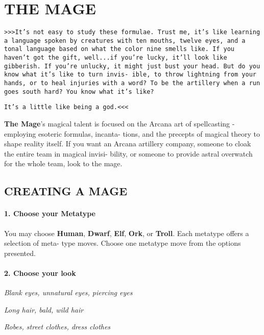 
\section{THE MAGE}
\begin{multicols}{3}
\setlength{\parskip}{.05cm}

\texttt{>>>It’s not easy to study these formulae. Trust me, it’s like
learning a language spoken by creatures with ten mouths,
twelve eyes, and a tonal language based on what the color
nine smells like. If you haven’t got the gift, well...if you’re
lucky, it’ll look like gibberish. If you’re unlucky, it might just
bust your head. But do you know what it’s like to turn invis-
ible, to throw lightning from your hands, or to heal injuries
with a word? To be the artillery when a run goes south hard?
You know what it’s like?}

\texttt{It’s a little like being a god.<<<}

\textbf{The Mage}’s magical talent is focused on the Arcana art
of spellcasting - employing esoteric formulas, incanta-
tions, and the precepts of magical theory to shape
reality itself. If you want an Arcana artillery company,
someone to cloak the entire team in magical invisi-
bility, or someone to provide astral overwatch for the
whole team, look to the mage.


\subsection{CREATING A MAGE}

\paragraph{1.  Choose your Metatype}

You may choose \textbf{Human}, \textbf{Dwarf}, \textbf{Elf}, \textbf{Ork}, or
\textbf{Troll}. Each metatype offers a selection of meta-
type moves. Choose one metatype move from
the options presented.

\paragraph{2.  Choose your look}

\textit{Blank eyes, unnatural eyes, piercing eyes}

\textit{Long hair, bald, wild hair}

\textit{Robes, street clothes, dress clothes}


\end{multicols}
